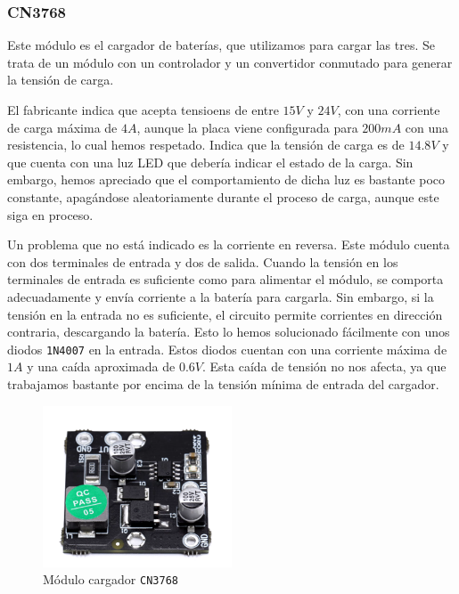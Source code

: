 \subsubsection{CN3768}

Este módulo es el cargador de baterías, que utilizamos para cargar las tres. Se trata de un módulo con un controlador y un convertidor conmutado para generar la tensión de carga. 

El fabricante indica que acepta tensioens de entre $15 V$ y $24 V$, con una corriente de carga máxima de $4 A$, aunque la placa viene configurada para $200 mA$ con una resistencia, lo cual hemos respetado. Indica que la tensión de carga es de $14.8 V$ y que cuenta con una luz LED que debería indicar el estado de la carga. Sin embargo, hemos apreciado que el comportamiento de dicha luz es bastante poco constante, apagándose aleatoriamente durante el proceso de carga, aunque este siga en proceso. \cite{consonanceCN3768}

Un problema que no está indicado es la corriente en reversa. Este módulo cuenta con dos terminales de entrada y dos de salida. Cuando la tensión en los terminales de entrada es suficiente como para alimentar el módulo, se comporta adecuadamente y envía corriente a la batería para cargarla. Sin embargo, si la tensión en la entrada no es suficiente, el circuito permite corrientes en dirección contraria, descargando la batería. Esto lo hemos solucionado fácilmente con unos diodos \texttt{1N4007} en la entrada. Estos diodos cuentan con una corriente máxima de $1 A$ y una caída aproximada de $0.6 V$. Esta caída de tensión no nos afecta, ya que trabajamos bastante por encima de la tensión mínima de entrada del cargador.

\begin{figure}[h]
    \centering
    \includegraphics[width=0.5\textwidth]{images/2-hardware/componentes/CN3768.png}
    \caption{Módulo cargador \texttt{CN3768}}
    \label{fig:hardware/modulos/cn3768}
\end{figure}